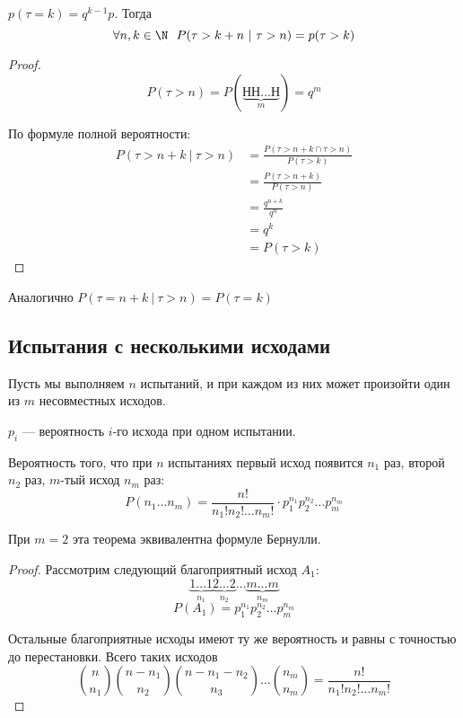 \documentclass[12pt, a4paper, oneside]{book}
\begin{document}
\begin{theorem}
    \(p(\tau = k) = q^{k - 1}p\). Тогда
    \[\forall n,k\in\N \ \ P(\tau > k + n\ |\ \tau > n) = p(\tau > k)\]
\end{theorem}
\begin{proof}
    \[P(\tau > n) = P(\underbrace{\text{НН}\dots\text{Н}}_{m})= q^m\]

    По формуле полной вероятности:
    \begin{align*}
        P(\tau > n + k\ |\ \tau > n) & = \frac{P(\tau > n + k \cap \tau > n)}{P(\tau > k)} \\
                                     & = \frac{P(\tau > n + k)}{P(\tau > n)}               \\
                                     & = \frac{q^{n + k}}{q^n}                             \\
                                     & = q^k                                               \\
                                     & = P(\tau > k)
    \end{align*}
\end{proof}

\begin{remark}
    Аналогично \(P(\tau = n + k\ |\ \tau > n) = P(\tau = k)\)
\end{remark}

\subsection{Испытания с несколькими исходами}

Пусть мы выполняем \(n\) испытаний, и при каждом из них может произойти один из \(m\) несовместных исходов.
\begin{obozn}
    \(p_i\) --- вероятность \(i\)-го исхода при одном испытании.
\end{obozn}

\begin{theorem}
    Вероятность того, что при \(n\) испытаниях первый исход появится \(n_1\) раз, второй \(n_2\) раз, \(m\)-тый исход \(n_m\) раз:
    \[P(n_1 \dots n_m) = \frac{n!}{n_1!n_2! \dots n_m!} \cdot p_1^{n_1} p_2^{n_2} \dots p_m^{n_m}\]
\end{theorem}

\begin{remark}
    При \(m = 2\) эта теорема эквивалентна формуле Бернулли.
\end{remark}

\begin{proof}
    Рассмотрим следующий благоприятный исход \(A_1\):
    \[\underbrace{1\dots 1}_{n_1} \underbrace{2\dots 2}_{n_2} \dots \underbrace{m\dots m}_{n_m}\]
    \[P(A_1) = p_1^{n_1} p_2^{n_2} \dots p_m^{n_m}\]

    Остальные благоприятные исходы имеют ту же вероятность и равны с точностью до перестановки. Всего таких исходов
    \[\binom{n}{n_1}\binom{n - n_1}{n_2}\binom{n - n_1 - n_2}{n_3} \dots \binom{n_m}{n_m} = \frac{n!}{n_1!n_2! \dots n_m!}\]
\end{proof}
\end{document}
